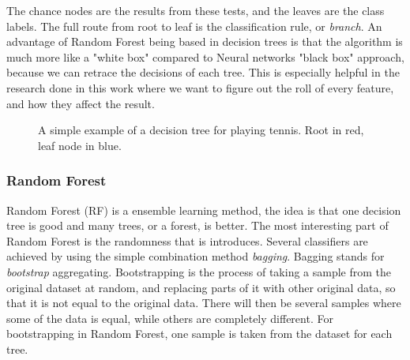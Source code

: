 The chance nodes are the results from these tests, and the leaves are the class labels. The full route from root to leaf is the classification rule, or \textit{branch}. An advantage of Random Forest being based in decision trees is that the algorithm is much more like a "white box" compared to Neural networks "black box" approach, because we can retrace the decisions of each tree. This is especially helpful in the research done in this work where we want to figure out the roll of every feature, and how they affect the result.

\begin{figure}[h]
\centering
{}
\caption{A simple example of a decision tree for playing tennis. Root in red, leaf node in blue.}
\label{fig:decision_tree}
\end{figure}
\subsubsection{Random Forest}
Random Forest (\ac{RF}) is a ensemble learning method, the idea is that one decision tree is good and many trees, or a forest, is better. The most interesting part of Random Forest is the randomness that is introduces. Several classifiers are achieved by using the simple combination method \textit{bagging}. Bagging stands for \textit{bootstrap} aggregating. Bootstrapping is the process of taking a sample from the original dataset at random, and replacing parts of it with other original data, so that it is not equal to the original data. There will then be several samples where some of the data is equal, while others are completely different. For bootstrapping in Random Forest, one sample is taken from the dataset for each tree. 

